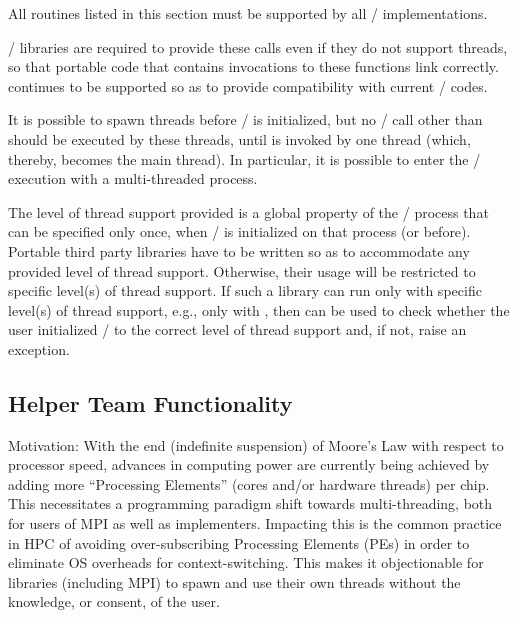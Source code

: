 All routines listed in this section
must be
supported by all \MPI/ implementations. 

\begin{rationale}
\MPI/ libraries are required to provide these calls even if they do
not support threads, so that portable code that contains invocations
to these functions  link correctly.   
continues to be 
supported so as to provide compatibility with current \MPI/ codes.
\end{rationale}

\begin{users}
It is possible to spawn threads before \MPI/ is initialized, but no
\MPI/ call other than   should be executed by these
threads, until  is invoked by one
thread (which, thereby, becomes the  main thread).  In particular, it is
possible to enter the \MPI/ execution with a multi-threaded process.

The level of thread support provided is a global property of the \MPI/
process that can be specified only once, when \MPI/ is initialized on
that process (or before).   Portable third party libraries have to be written so as to
accommodate any provided level of thread support.   
Otherwise, their usage will be restricted to specific level(s) of thread support.
If such a library can run only with specific level(s) of thread support, e.g.,
only with , then
 can be used to check whether the
user initialized \MPI/ to the correct level of thread support and,
if not, raise an exception. 
\end{users}

\subsection{Helper Team Functionality}

Motivation: With the end (indefinite suspension) of
Moore's Law with respect to processor speed,
advances in computing power are currently being achieved by
adding more “Processing Elements” (cores and/or hardware
threads) per chip. This necessitates a programming paradigm
shift towards multi-threading, both for users of MPI as well as
implementers. Impacting this is the common practice in HPC of avoiding
over-subscribing Processing Elements (PEs) in order to eliminate OS
overheads for context-switching. This makes it objectionable for libraries
(including MPI) to spawn and use their own threads without the knowledge,
or consent, of the user.

